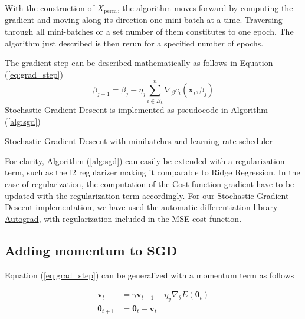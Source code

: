 \documentclass
[twocolumn,
secnumarabic,
nobibnotes,
aps,
prl,
reprint,
groupedaddress,
amsmath,
amssymb
]{revtex4-2}
\begin{document}
With the construction of $X_\text{perm}$, the algorithm moves forward by computing the gradient and moving along its direction one mini-batch at a time. Traversing through all mini-batches or a set number of them constitutes to one epoch. The algorithm just described is then rerun for a specified number of epochs.

The gradient step can be described mathematically as follows in Equation (\ref{eq:grad_step})
\begin{equation}\label{eq:grad_step}
  \beta_{j+1} = \beta_j - \eta_j\sum_{i \in B_k}^n\nabla_\beta c_i(\bm{x}_i,\beta_j)
\end{equation}
Stochastic Gradient Descent is implemented as pseudocode in Algorithm (\ref{alg:sgd})

\begin{algorithm}
  \SetAlgoLined
  \Return{$\theta$}
  \caption{\label{alg:sgd}Stochastic Gradient Descent with minibatches and learning rate scheduler}
\end{algorithm}

For clarity, Algorithm (\ref{alg:sgd}) can easily be extended with a regularization term, such as the l2 regularizer making it comparable to Ridge Regression. In the case of regularization, the computation of the Cost-function gradient have to be updated with the regularization term accordingly. For our Stochastic Gradient Descent implementation, we have used the automatic differentiation library \href{https://github.com/HIPS/autograd}{Autograd}, with regularization included in the MSE cost function.

\subsection{Adding momentum to SGD}
Equation (\ref{eq:grad_step}) can be generalized with a momentum term as follows

\begin{equation}
  \label{eq:momentum_grad}
  \begin{aligned}
    \nonumber
    \bm{v}_t          & = \gamma\bm{v}_{t-1} + \eta_y\nabla_\theta E(\bm{\theta}_t) \\
    \bm{\theta}_{t+1} & = \bm{\theta}_t - \bm{v}_t
  \end{aligned}
\end{equation}
\end{document}
